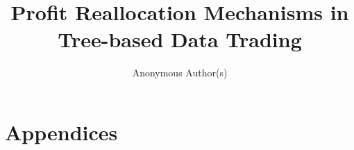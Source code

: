 \documentclass[runningheads]{llncs}
\title{Profit Reallocation Mechanisms in Tree-based Data Trading}
\author{Anonymous Author(s)}
\institute{Anonymous Institution(s)}
\begin{document}
\maketitle


\newpage










\newpage
\appendix
\section*{Appendices}



\end{document}
